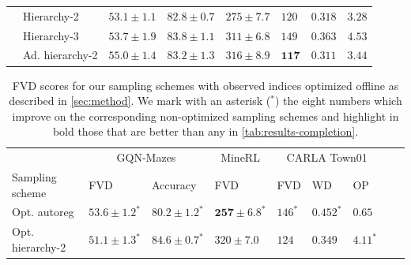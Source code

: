\begin{table}
\begin{tabular}{llllllll}
    &  Hierarchy-2          & $\mathbf{53.1 \pm 1.1}$ & $82.8 \pm 0.7$   & $275 \pm 7.7$        & $120$     & $0.318$  &  $3.28$      \\
    &  Hierarchy-3          & $53.7 \pm 1.9$          & $\mathbf{83.8 \pm 1.1}$   & $311 \pm 6.8$        & $149$      & $0.363$    &  $4.53$  \\
    &  Ad. hierarchy-2      & $55.0 \pm 1.4$          & $83.2 \pm 1.3$   & $316 \pm 8.9$    & $\mathbf{117}$          & $\mathbf{0.311}$     & $3.44$    \\
    \bottomrule
  \end{tabular}
\end{table}

\begin{table} %
  \small
  \caption{FVD scores for our sampling schemes with observed indices optimized offline as described in \cref{sec:method}.  We mark with an asterisk ($^*$) the eight numbers which improve on the corresponding non-optimized sampling schemes and highlight in bold those that are better than any in \cref{tab:results-completion}.}
  \vspace{2mm}
  \label{tab:optimized}
  \centering
  \begin{tabular}{lllllllll}
    \toprule
     & \multicolumn{2}{c}{GQN-Mazes}  & \multicolumn{1}{c}{MineRL}  & \multicolumn{3}{c}{CARLA Town01} \\
    \cmidrule(r){2-3} \cmidrule(r){4-4} \cmidrule(r){5-7}
    Sampling scheme       & FVD     & Accuracy    &    FVD & FVD & WD & OP \\
    \midrule
    Opt. autoreg        & $53.6 \pm 1.2^*$            & $80.2 \pm 1.2^*$            & $\mathbf{257 \pm 6.8}^*$    &   $146^*$ & $0.452^*$ & $0.65$   \\
    Opt. hierarchy-2   & $\mathbf{51.1 \pm 1.3}^*$    & $\mathbf{84.6 \pm 0.7}^*$   & $320 \pm 7.0$    &   $124$ & $0.349$ & $4.11^*$   \\
    \bottomrule
  \end{tabular}
\end{table}

